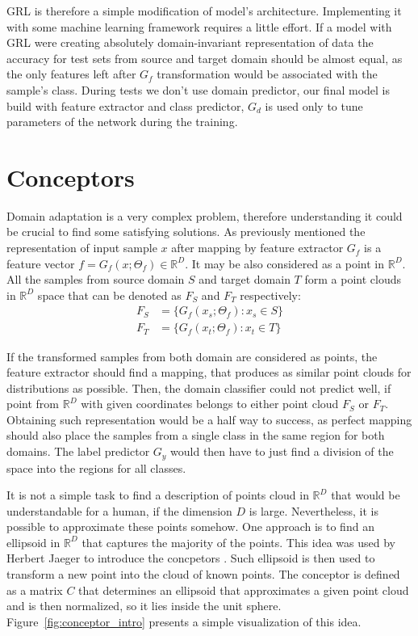\documentclass[shortabstract, inz, english]{iithesis}
\begin{document}
\par
GRL is therefore a simple modification of model's architecture. Implementing it with some machine learning framework requires a little effort. If a model with GRL were creating absolutely domain-invariant representation of data the accuracy for test sets from source and target domain should be almost equal, as the only features left after $G_{f}$ transformation would be associated with the sample's class. During tests we don't use domain predictor, our final model is build with feature extractor and class predictor, $G_{d}$ is used only to tune parameters of the network during the training.



\section{Conceptors}
Domain adaptation is a very complex problem, therefore understanding it could be crucial to find some satisfying solutions. As previously mentioned the representation of input sample $x$ after mapping by feature extractor $G_{f}$ is a feature vector $f = G_{f}(x ; \Theta_{f}) \in \mathbb{R}^{D}$. It may be also considered as a point in $\mathbb{R}^{D}$. All the samples from source domain $S$ and target domain $T$ form a point clouds in $\mathbb{R}^{D}$ space that can be denoted as $F_{S}$ and $F_{T}$ respectively:
\begin{align*}
    F_{S} &= \{ G_{f}(x_{s} ; \Theta_{f}) : x_{s} \in S  \} \\
    F_{T} &= \{ G_{f}(x_{t} ; \Theta_{f}) : x_{t} \in T  \}
\end{align*}
\par
If the transformed samples from both domain are considered as points, the feature extractor should find a mapping, that produces as similar point clouds for distributions as possible. Then, the domain classifier could not predict well, if point from $\mathbb{R}^{D}$ with given coordinates belongs to either point cloud $F_{S}$ or $F_{T}$. Obtaining such representation would be a half way to success, as perfect mapping should also place the samples from a single class in the same region for both domains. The label predictor $G_{y}$ would then have to just find a division of the space into the regions for all classes.
\par
It is not a simple task to find a description of points cloud in $\mathbb{R}^{D}$ that would be understandable for a human, if the dimension $D$ is large. Nevertheless, it is possible to approximate these points somehow. One approach is to find an ellipsoid in $\mathbb{R}^{D}$ that captures the majority of the points. This idea was used by Herbert Jaeger to introduce the concpetors \cite{conc}. Such ellipsoid is then used to transform a new point into the cloud of known points. The conceptor is defined as a matrix $C$ that determines an ellipsoid that approximates a given point cloud and is then normalized, so it lies inside the unit sphere. Figure~\ref{fig:conceptor_intro} presents a simple visualization of this idea.
\end{document}
